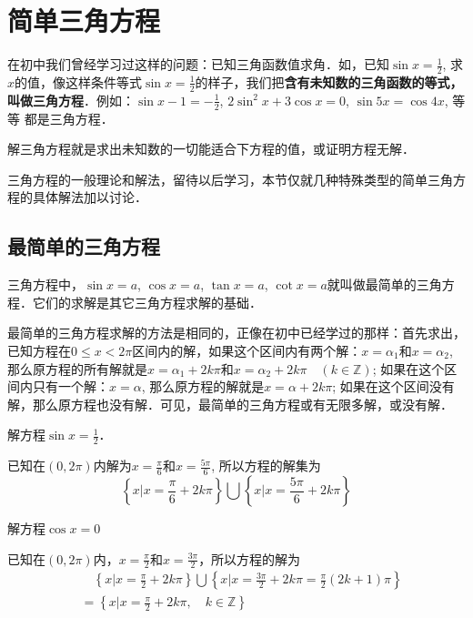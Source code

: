\section{简单三角方程}
在初中我们曾经学习过这样的问题：已知三角函数值求角．如，已知$\sin x=\frac{1}{2}$, 求$x$的值，像这样条件等式$\sin x=\frac{1}{2}$的样子，我们把\textbf{含有未知数的三角函数的等式，叫做三角方程}．例如：$\sin x-1=-\frac{1}{2}$, 
$2\sin^2x+3\cos x=0$, $\sin5x=\cos4x$, 等等
都是三角方程．

解三角方程就是求出未知数的一切能适合下方程的值，或证明方程无解．

三角方程的一般理论和解法，留待以后学习，本节仅就几种特殊类型的简单三角方程的具体解法加以讨论．

\subsection{最简单的三角方程}

三角方程中，$\sin x=a$,
$\cos x=a$, $\tan x=a$, $\cot x=a$就叫做最简单的三角方程．它们的求解是其它三角方程求解的基础．

最简单的三角方程求解的方法是相同的，正像在初中已经学过的那样：首先求出，已知方程在$0\le x<2\pi$区间内的解，如果这个区间内有两个解：$x=\alpha_1$和$x=\alpha_2$, 那么原方程的所有解就是$x=\alpha_1+2k\pi$和$x=\alpha_2+2k\pi\quad (k\in\mathbb{Z})$; 如果在这个区间内只有一个解：$x=\alpha$, 那么原方程的解就是$x=\alpha+2k\pi$; 如果在这个区间没有解，那么原方程也没有解．可见，最简单的三角方程或有无限多解，或没有解．


\begin{example}
    解方程$\sin x=\frac{1}{2}$．
\end{example}

\begin{solution}
    已知在$(0, 2\pi)$内解为$x=\frac{\pi}{6}$和$x=\frac{5\pi}{6}$,
所以方程的解集为
\[\left\{x\Big|x=\frac{\pi}{6}+2k\pi\right\} \bigcup \left\{x\Big|x=\frac{5\pi}{6}+2k\pi\right\}\]
\end{solution}


\begin{example}
    解方程$\cos x=0$
\end{example}

\begin{solution}
    已知在$(0, 2\pi)$内，$x=\frac{\pi}{2}$和$x=\frac{3\pi}{2}$，所以方程的解为
    \[\begin{split}
 &\quad        \left\{x\Big|x=\frac{\pi}{2}+2k\pi\right\} \bigcup \left\{x\Big|x=\frac{3\pi}{2}+2k\pi=\frac{\pi}{2}(2k+1)\pi\right\}\\
        &=\left\{x\Big|x=\frac{\pi}{2}+2k\pi,\quad k\in\mathbb{Z}\right\} 
    \end{split} \]
\end{solution}


